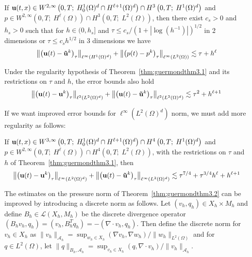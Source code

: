 \documentclass[letterpaper]{erdc}
\begin{document}
\begin{theorem}\label{thm:guermondthm3.2}
If $\textbf{u}(t,x)\in W^{2,\infty}\left(0,T;\; H_0^1(\Omega)^d \cap H^{\ell+1}(\Omega)^d  \right) \cap H^3\left(0,T;\; H^1(\Omega)^d\right)$ and $p\in W^{2,\infty}\left(0,T;\; H^{\ell}(\Omega) \right)\cap H^3\left(0,T;\; L^2(\Omega)\right)$, then there exist $c_s>0$ and $h_s>0$ such that for $h\in (0,h_s]$ and $\tau \leq c_s /\left(1+|\log(h^{-1})| \right)^{1/2}$ in 2 dimensions or $\tau \leq c_s h^{1/2}$ in 3 dimensions we have
  \begin{equation}
    \left\| \left(\textbf{u}(t) - \mathbf{\tilde{u}}^k \right)_{\tau} \right\|_{\ell^{\infty}\left(H^1(\Omega)^d\right)} + \left\| \left(p(t) - p^k \right)_{\tau} \right\|_{\ell^{\infty}\left(L^2(\Omega)\right)} \lesssim \tau + h^{\ell}
  \end{equation}
\end{theorem}

\begin{theorem}\label{thm:guermondthm3.3}
Under the regularity hypothesis of Theorem~\ref{thm:guermondthm3.1} and its restrictions on $\tau$ and $h$, the error bounds also hold
    \begin{equation}
      \left\| \left(\textbf{u}(t) - \textbf{u}^k \right)_{\tau} \right\|_{\ell^{2}\left(L^2(\Omega)^d\right)} + \left\| \left(\textbf{u}(t) - \mathbf{\tilde{u}}^k \right)_{\tau} \right\|_{\ell^{2}\left(L^2(\Omega)^d\right)} \lesssim \tau^2 + h^{\ell+1}
    \end{equation}
\end{theorem}

If we want improved error bounds for $\ell^{\infty}\left( L^2(\Omega)^d \right)$ norm, we must add more regularity as follows:
\begin{theorem}\label{thm:guermondthm3.4}
If $\textbf{u}(t,x)\in W^{3,\infty}\left(0,T;\; H_0^1(\Omega)^d \cap H^{\ell+1}(\Omega)^d  \right) \cap H^4\left(0,T;\; H^1(\Omega)^d\right)$ and $p\in W^{2,\infty}\left(0,T;\; H^{\ell}(\Omega) \right)\cap H^4\left(0,T;\; L^2(\Omega)\right)$, with the restrictions on $\tau$ and $h$ of Theorem~\ref{thm:guermondthm3.1}, then
  \begin{equation}
    \left\| \left(\textbf{u}(t) - \textbf{u}^k \right)_{\tau} \right\|_{\ell^{\infty}\left(L^2(\Omega)^d\right)} + \left\| \left(\textbf{u}(t) - \mathbf{\tilde{u}}^k \right)_{\tau} \right\|_{\ell^{\infty}\left(L^2(\Omega)^d\right)} \lesssim \tau^{7/4} + \tau^{3/4}h^{\ell} + h^{\ell+1}
  \end{equation}
\end{theorem}

The estimates on the pressure norm of Theorem~\ref{thm:guermondthm3.2} can be improved by introducing a discrete norm as follows.  Let $(v_h,q_h) \in X_h\times M_h$ and define $B_h \in \mathcal{L}(X_h,M_h)$ be the discrete divergence operator $(B_h v_h, q_h) = (v_h, B_h^T q_h) = -(\nabla\cdot v_h, q_h)$.  Then define the discrete norm for $v_h \in X_h$ as $\|v_h\|_{\mathcal{A}_h} = \sup_{w_h \in X_h} (\nabla v_h, \nabla w_h)/ \|w_h\|_{L^2(\Omega)}$ and for $q\in L^2(\Omega)$, let $\|q\|_{B_h, \mathcal{A}_h} = \sup_{v_h\in X_h} (q, \nabla\cdot v_h)/ \|v_h\|_{\mathcal{A}_h}$.
\end{document}
